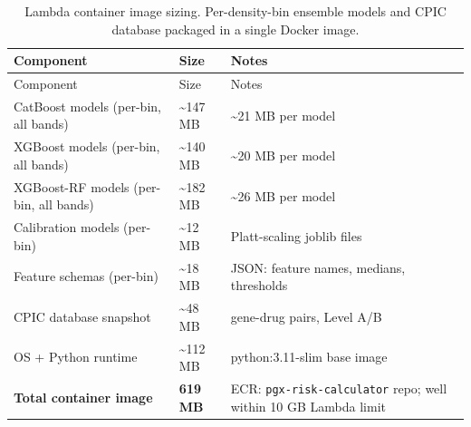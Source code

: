 \documentclass[
  12pt,
]{book}
\begin{document}
\begin{longtable}[]{@{}
  >{\raggedright\arraybackslash}p{}
  >{\raggedleft\arraybackslash}p{}
  >{\raggedright\arraybackslash}p{}@{}}
\caption{Lambda container image sizing. Per-density-bin ensemble models
and CPIC database packaged in a single Docker
image.}\label{tbl-sizing}\tabularnewline
\toprule\noalign{}
\begin{minipage}[b]{\linewidth}\raggedright
Component
\end{minipage} & \begin{minipage}[b]{\linewidth}\raggedleft
Size
\end{minipage} & \begin{minipage}[b]{\linewidth}\raggedright
Notes
\end{minipage} \\
\midrule\noalign{}
\endfirsthead
\toprule\noalign{}
\begin{minipage}[b]{\linewidth}\raggedright
Component
\end{minipage} & \begin{minipage}[b]{\linewidth}\raggedleft
Size
\end{minipage} & \begin{minipage}[b]{\linewidth}\raggedright
Notes
\end{minipage} \\
\midrule\noalign{}
\endhead
\bottomrule\noalign{}
\endlastfoot
CatBoost models (per-bin, all bands) & \textasciitilde147 MB &
\textasciitilde21 MB per model \\
XGBoost models (per-bin, all bands) & \textasciitilde140 MB &
\textasciitilde20 MB per model \\
XGBoost-RF models (per-bin, all bands) & \textasciitilde182 MB &
\textasciitilde26 MB per model \\
Calibration models (per-bin) & \textasciitilde12 MB & Platt-scaling
joblib files \\
Feature schemas (per-bin) & \textasciitilde18 MB & JSON: feature names,
medians, thresholds \\
CPIC database snapshot & \textasciitilde48 MB & 573 gene-drug pairs,
Level A/B \\
OS + Python runtime & \textasciitilde112 MB & python:3.11-slim base
image \\
\textbf{Total container image} & \textbf{619 MB} & ECR:
\texttt{pgx-risk-calculator} repo; well within 10 GB Lambda limit \\
\end{longtable}
\end{document}
